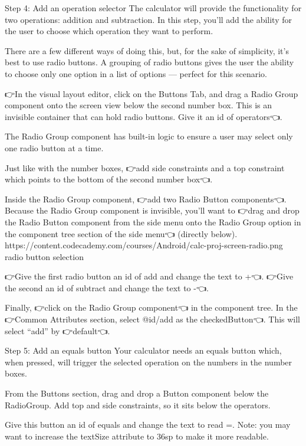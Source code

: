     Step 4: Add an operation selector
        The calculator will provide the functionality for two operations: addition and subtraction. In this step, you’ll add the ability for the user to choose which operation they want to perform.

        There are a few different ways of doing this, but, for the sake of simplicity, it’s best to use radio buttons. A grouping of radio buttons gives the user the ability to choose only one option in a list of options — perfect for this scenario.

        👉In the visual layout editor, click on the Buttons Tab, and drag a Radio Group component onto the screen view below the second number box. This is an invisible container that can hold radio buttons. Give it an id of operators👈.

        The Radio Group component has built-in logic to ensure a user may select only one radio button at a time.

        Just like with the number boxes, 👉add side constraints and a top constraint which points to the bottom of the second number box👈.

        Inside the Radio Group component, 👉add two Radio Button components👈. Because the Radio Group component is invisible, you’ll want to 👉drag and drop the Radio Button component from the side menu onto the Radio Group option in the component tree section of the side menu👈 (directly below).
            🎨https://content.codecademy.com/courses/Android/calc-proj-screen-radio.png
                radio button selection

        👉Give the first radio button an id of add and change the text to +👈. 👉Give the second an id of subtract and change the text to -👈.

        Finally, 👉click on the Radio Group component👈 in the component tree. In the 👉Common Attributes section, select @id/add as the checkedButton👈. This will select “add” by 👉default👈.

    Step 5: Add an equals button
        Your calculator needs an equals button which, when pressed, will trigger the selected operation on the numbers in the number boxes.

        From the Buttons section, drag and drop a Button component below the RadioGroup. Add top and side constraints, so it sits below the operators.

        Give this button an id of equals and change the text to read =. Note: you may want to increase the textSize attribute to 36sp to make it more readable.

